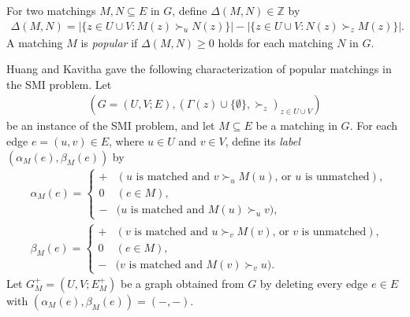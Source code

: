 \documentclass[11pt,a4paper,showkeys]{article}
\theoremstyle{plain}
\theoremstyle{definition}
\newcommand{\ZZ}{{\mathbb{Z}}}
\begin{document}
For two matchings $M,N\subseteq E$ in $G$, 
define $\Delta(M,N)\in \ZZ$ by 
\begin{align*}
    \Delta (M,N) = |\{z\in U\cup V \colon M(z) \succ_u N(z)\}| - |\{z\in U\cup V \colon N(z) \succ_z M(z)\}|. 
\end{align*}
A matching $M$ is \emph{popular} if 
$\Delta(M,N)\ge 0$ holds for each matching $N$ in $G$. 

Huang and Kavitha \cite{HK13} gave the following characterization of popular matchings in the SMI problem. 
Let 
\begin{align*}
    (G=(U,V;E),(\Gamma(z) \cup \{\emptyset\},\succ_z)_{z\in U\cup V})
\end{align*}
be an instance of the SMI problem, 
and let $M\subseteq E$ be a matching in $G$. 
For each edge $e=(u,v)\in E$, 
where $u\in U$ and $v\in V$, 
define its \emph{label} $(\alpha_M(e),\beta_M(e))$ by 
\begin{align}
    \label{EQalpha}
    &{}\alpha_M(e) = 
    \begin{cases}
        + & (\mbox{$u$ is matched and $v\succ_u M(u)$, or $u$ is unmatched}), \\
        0 & (e\in M), \\
        - & (\mbox{$u$ is matched and $M(u)\succ_u v$)}, 
    \end{cases} \\
    \label{EQdelta}
    &{}\beta_M(e) = 
    \begin{cases}
        + & (\mbox{$v$ is matched and $u\succ_v M(v)$, or $v$ is unmatched}), \\
        0 & (e\in M), \\
        - & (\mbox{$v$ is matched and $M(v)\succ_v u$)}. 
    \end{cases}
\end{align}
Let $G_M^+=(U, V; E_M^+)$ be a graph obtained from $G$ by deleting every edge $e\in E$ with 
$(\alpha_M(e), \beta_M(e))=(-,-)$. 
\end{document}
